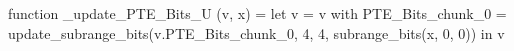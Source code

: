 function _update_PTE_Bits_U (v, x) = let v = { v with PTE_Bits_chunk_0 = update_subrange_bits(v.PTE_Bits_chunk_0, 4, 4, subrange_bits(x, 0, 0)) } in
  v
